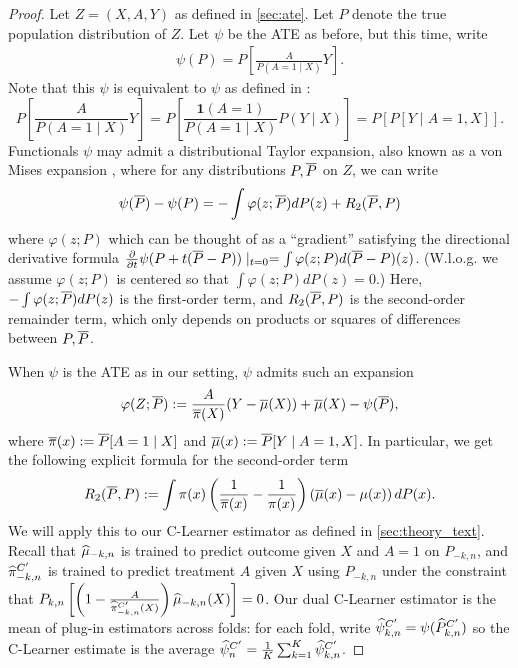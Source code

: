 \begin{proof}
Let $Z=(X,A,Y)$ as defined in \cref{sec:ate}. Let $P$ denote the true population distribution of $Z$. 
Let $\psi$ be the ATE as before, but this time, write \begin{align}
\label{eq:psi_ipw_def_dual}
\psi(P)=P\left[\frac{A}{P(A=1\mid X)}   Y\right].  
\end{align}
Note that this $\psi$ is equivalent to $\psi$ as defined in :
$$P\left[\frac{A}{P(A=1\mid X)}Y\right]=P\left[\frac{\mathbf 1(A=1)}{P(A=1\mid X)} P(Y\mid X)\right]=P[P[Y\mid A=1,X]].$$
Functionals $\psi$ may admit a distributional Taylor expansion, also known as a von Mises expansion \citep{fernholz2012mises}, where for any distributions $P,\overline{P}$ on $Z$, we can write
\begin{align}
\label{eq:taylor_dual}
    \psi(\overline{P})-\psi(P)=-\int \varphi(z;\overline{P})dP(z)+R_2(\overline{P}, P)
\end{align}
where 
$\varphi(z;P)$ which can be thought of as a ``gradient'' satisfying the directional derivative formula 
$\frac{\partial}{\partial t}\psi(P+t(\overline{P}-P))\mid_{t=0}=\int \varphi(z;P)d(\overline{P}-P)(z)$. (W.l.o.g. we assume $\varphi(z;P)$ is centered so that
$\int \varphi(z;P)dP(z)=0$.)
Here, $-\int \varphi(z;\overline{P})dP(z)$ is the first-order term, and $R_2(\overline{P}, P)$
is the second-order remainder term, which only depends on products or squares of differences between $P,\overline{P}$.

When $\psi$ is the ATE as in our setting, $\psi$ admits such an expansion~\citep{HiranoImRi03} 
\begin{align}
\label{eq:full_if_dual}
\varphi(Z;\overline{P}):=\frac{A}{\overline{\pi}(X)}(Y-\overline{\mu}(X))+\overline{\mu}(X)-\psi(\overline{P}),
\end{align}
where $\overline{\pi}(x):=\overline{P}[A=1\mid X]$
and $\overline{\mu}(x):=\overline{P}[Y\mid A=1,X]$. In particular, we get the following explicit formula for the second-order term
\begin{align}
R_2(\overline{P},P) := \int \pi(x) \left( \frac{1}{\overline{\pi}(x)} - \frac{1}{\pi(x)} \right) \left( \overline{\mu} (x) - \mu(x) \right) dP(x).
\end{align}
We will apply this to our C-Learner estimator as defined in \cref{sec:theory_text}. Recall that
$\widehat{\mu}_{-k,n}$ is trained to predict outcome given $X$ and $A=1$ on $P_{-k,n}$, and 
$\widehat{\pi}_{-k,n}^{C'}$ is trained to predict treatment $A$ given $X$ using $P_{-k,n}$
under the constraint that $P_{k,n}\left[\left(1-\frac{A}{\widehat{\pi}_{-k,n}^{C'}(X)}\right)\widehat{\mu}_{-k,n}(X) \right]=0$.
Our dual C-Learner estimator is the mean of plug-in estimators across folds: for each fold, write $\widehat{\psi}^{C'}_{k,n}=\psi(\widehat{P}_{k,n}^{C'})$ so the C-Learner estimate is the average $\widehat{\psi}^{C'}_n=\frac{1}{K}\sum_{k=1}^K \widehat{\psi}^{C'}_{k,n}$.



\end{proof}
